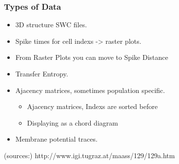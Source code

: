 \documentclass{beamer}
\begin{document}



\begin{frame}
	\frametitle{Types of Data}%
	\begin{itemize}
		
		\vfill\item 3D structure SWC files.
		\vfill \item Spike times for cell indexs -> raster plots.
		\vfill \item From Raster Plots you can move to Spike Distance
		\vfill \item Transfer Entropy.
		\vfill \item Ajacency matrices, sometimes population specific.
			\begin{itemize}
				\vfill \item Ajacency matrices, Indexs are sorted before
				\vfill \item Displaying as a chord diagram
			\end{itemize}
		\vfill \item Membrane potential traces.	
\end{itemize}
\vfill
\fontsize{6pt}{6pt}\selectfont 
(sources:)
http://www.igi.tugraz.at/maass/129/129a.htm

\end{frame}

		
\end{document}

